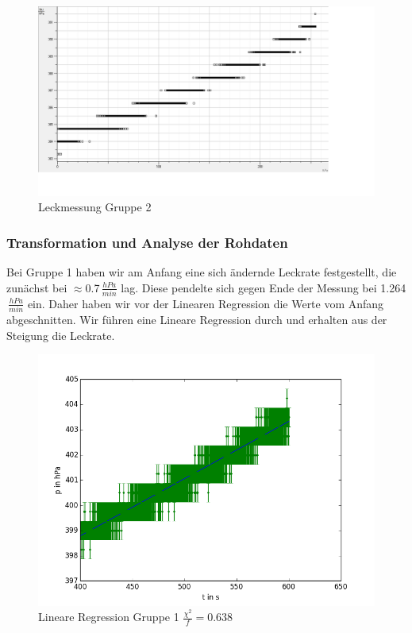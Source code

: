 \documentclass[12pt,a4paper]{article}
\begin{document}
\begin{figure}[H]
\centering
\includegraphics[scale=0.3]{Bilder/dichtigkeit_raw_EL.png}
\caption{Leckmessung Gruppe 2}
\end{figure}

\subsubsection{Transformation und Analyse der Rohdaten}

Bei Gruppe 1 haben wir am Anfang eine sich ändernde Leckrate festgestellt, die zunächst bei $\approx$0.7$\,\frac{hPa}{min}$ lag. Diese pendelte sich gegen Ende der Messung bei 1.264$\,\frac{hPa}{min}$ ein. Daher haben wir vor der Linearen Regression die Werte vom Anfang abgeschnitten. Wir führen eine Lineare Regression durch und erhalten aus der Steigung die Leckrate.

\begin{figure}[H]
\centering
\includegraphics[scale=0.5]{Bilder/dichtigkeit__JM.png}
\caption{Lineare Regression Gruppe 1 $\frac{\chi^2}{f}=0.638$}
\end{figure}
\end{document}
